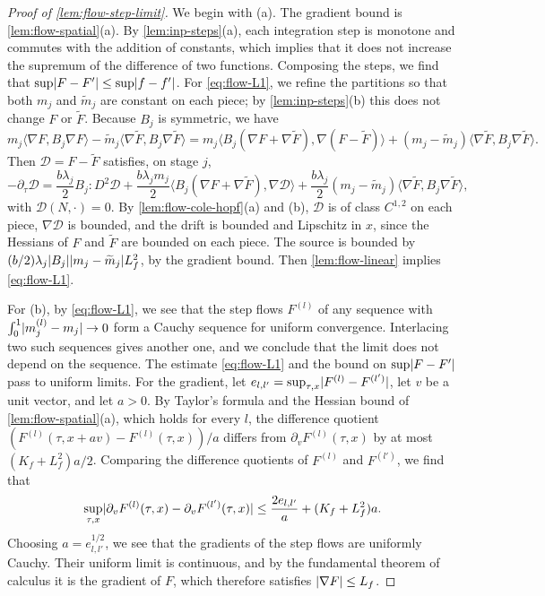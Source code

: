 \begin{proof}[Proof of \cref{lem:flow-step-limit}]
We begin with (a). The gradient bound is \cref{lem:flow-spatial}(a). By
\cref{lem:inp-steps}(a), each integration step is monotone and commutes with
the addition of constants, which implies that it does not increase the supremum
of the difference of two functions. Composing the steps, we find that
$\sup\lvert F-F'\rvert\le\sup\lvert f-f'\rvert$. For \eqref{eq:flow-L1}, we refine the partitions
so that both $m_j$ and $\widetilde m_j$ are constant on each piece; by
\cref{lem:inp-steps}(b) this does not change $F$ or $\widetilde F$. Because $B_j$
is symmetric, we have
\[
 m_j\langle\nabla F,B_j\nabla F\rangle-\widetilde m_j\langle\nabla\widetilde F,
 B_j\nabla\widetilde F\rangle
 =m_j\bigl\langle B_j(\nabla F+\nabla\widetilde F),\nabla(F-\widetilde F)\bigr\rangle
 +(m_j-\widetilde m_j)\langle\nabla\widetilde F,B_j\nabla\widetilde F\rangle.
\]
Then $\mathcal D=F-\widetilde F$ satisfies, on stage $j$,
\[
 -\partial_\tau \mathcal D=\frac{b\lambda_j}{2}B_j\mathbin{:}D^2\mathcal D
 +\frac{b\lambda_jm_j}{2}\bigl\langle B_j(\nabla F+\nabla\widetilde F),\nabla \mathcal D\bigr\rangle
 +\frac{b\lambda_j}{2}(m_j-\widetilde m_j)\langle\nabla\widetilde F,B_j\nabla\widetilde F\rangle,
\]
with $\mathcal D(N,\cdot)=0$. By \cref{lem:flow-cole-hopf}(a) and (b), $\mathcal D$ is of class
$C^{1,2}$ on each piece, $\nabla \mathcal D$ is bounded, and the drift is bounded and
Lipschitz in $x$, since the Hessians of $F$ and $\widetilde F$ are bounded on each
piece. The source is bounded by $(b/2)\lambda_j\lvert B_j\rvert\lvert m_j-\widetilde m_j\rvert L_f^2$,
by the gradient bound. Then \cref{lem:flow-linear} implies \eqref{eq:flow-L1}.

For (b), by \eqref{eq:flow-L1}, we see that the step flows $F^{(l)}$ of any
sequence with $\int_0^1\lvert m_j^{(l)}-m_j\rvert\to0$ form a Cauchy sequence for
uniform convergence. Interlacing two such sequences gives another one, and we
conclude that the limit does not depend on the sequence. The estimate
\eqref{eq:flow-L1} and the bound on $\sup\lvert F-F'\rvert$ pass to uniform limits. For the
gradient, let $e_{l,l'}=\sup_{\tau,x}\lvert F^{(l)}-F^{(l')}\rvert$, let $v$ be a unit
vector, and let $a>0$. By Taylor's formula and the Hessian bound of
\cref{lem:flow-spatial}(a), which holds for every $l$, the difference quotient
$(F^{(l)}(\tau,x+av)-F^{(l)}(\tau,x))/a$ differs from $\partial_vF^{(l)}(\tau,x)$ by
at most $(K_f+L_f^2)a/2$. Comparing the difference quotients of $F^{(l)}$ and
$F^{(l')}$, we find that
\[
 \sup_{\tau,x}\lvert \partial_vF^{(l)}(\tau,x)-\partial_vF^{(l')}(\tau,x)\rvert
 \le\frac{2e_{l,l'}}a+(K_f+L_f^2)a.
\]
Choosing $a=e_{l,l'}^{1/2}$, we see that the gradients of the step flows are
uniformly Cauchy. Their uniform limit is continuous, and by the fundamental
theorem of calculus it is the gradient of $F$, which therefore satisfies
$\lvert \nabla F\rvert\le L_f$.


\end{proof}
